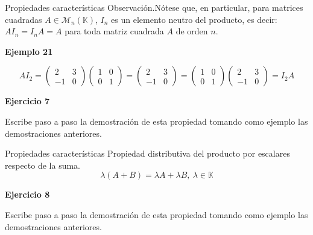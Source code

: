 \documentclass[
  ignorenonframetext,
]{beamer}
\begin{document}
\begin{frame}{Propiedades características}
\protect\hypertarget{propiedades-caracteruxedsticas-15}{}
Observación.Nótese que, en particular, para matrices cuadradas
\(A\in\mathcal{M}_n(\mathbb{K})\), \(I_n\) es un elemento neutro del
producto, es decir: \(AI_n=I_nA=A\) para toda matriz cuadrada \(A\) de
orden \(n\).

\textbf{Ejemplo 21}

\[AI_2 = \begin{pmatrix}2&3\\-1&0\end{pmatrix}\begin{pmatrix}1&0\\0&1\end{pmatrix} = \begin{pmatrix}2&3\\-1&0\end{pmatrix} =\begin{pmatrix}1&0\\0&1\end{pmatrix}\begin{pmatrix}2&3\\-1&0\end{pmatrix}=I_2A\]

\textbf{Ejercicio 7}

Escribe paso a paso la demostración de esta propiedad tomando como
ejemplo las demostraciones anteriores.
\end{frame}

\begin{frame}{Propiedades características}
\protect\hypertarget{propiedades-caracteruxedsticas-16}{}
Propiedad distributiva del producto por escalares respecto de la suma.
\[\lambda(A+B) = \lambda A+\lambda B,\ \lambda\in\mathbb{K}\]

\textbf{Ejercicio 8}

Escribe paso a paso la demostración de esta propiedad tomando como
ejemplo las demostraciones anteriores.
\end{frame}
\end{document}
